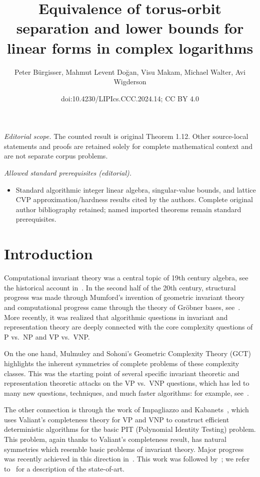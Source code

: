 \documentclass[10pt,a4paper]{article}
\title{Equivalence of torus-orbit separation and lower bounds for linear forms in complex logarithms}
\author{Peter Bürgisser, Mahmut Levent Doğan, Visu Makam, Michael Walter, Avi Wigderson}
\date{doi:10.4230/LIPIcs.CCC.2024.14; CC BY 4.0}
\theoremstyle{definition}
\numberwithin{equation}{section}
\begin{document}
\maketitle
\noindent\textit{Editorial scope.} The counted result is original Theorem 1.12. Other source-local statements and proofs are retained solely for complete mathematical context and are not separate corpus problems.\par\medskip
\noindent\textit{Allowed standard prerequisites (editorial).}\begin{itemize}
\item Standard algorithmic integer linear algebra, singular-value bounds, and lattice CVP approximation/hardness results cited by the authors. Complete original author bibliography retained; named imported theorems remain standard prerequisites.
\end{itemize}\medskip
\section{Introduction}
\label{sec:intro}

Computational invariant theory was a central topic of 19th century algebra,
see the historical account in~\cite{kung-rota:84}.
In the second half of the 20th century, structural progress was made through Mumford's invention
of geometric invariant theory ~\cite{MFK:94} and computational progress came through the theory of Gr\"{o}bner bases, see~\cite{Sturmfels}.
More recently, it was realized that algorithmic questions in invariant and representation theory
are deeply connected with the core complexity questions of P vs.~NP  and VP vs.~VNP.

On the one hand,
Mulmuley and Sohoni's Geometric Complexity Theory (GCT)~\cite{mulmuley2001geometric}
highlights the inherent symmetries of complete problems of these complexity classes.
This was the starting point of several specific invariant theoretic and
representation theoretic attacks on the VP vs.~VNP questions, which has led
to many new questions, techniques, and much faster algorithms:
for example, see~\cite{GCTV,FS,BCMW:17,MW19}.

The other connection is through
the work of Impagliazzo and Kabanets~\cite{KI04},
which uses Valiant's completeness theory for VP and VNP
to construct efficient deterministic algorithms
for the basic PIT (Polynomial Identity Testing) problem.
This problem, again thanks to Valiant's completeness result, has natural symmetries
which resemble basic problems of invariant theory.
Major progress was recently achieved in this direction in~\cite{Gur04,GGOW16,IQS,IQS2,DM-poly}.
This work was followed by~\cite{DM-oc, hamada-hirai, ivanyos-qiao,GGOW:20,BGOWW,BFGOWW,BLNW:20,BFGOWW2};
we refer to~\cite{BFGOWW2} for a description of the state-of-art.
\end{document}
